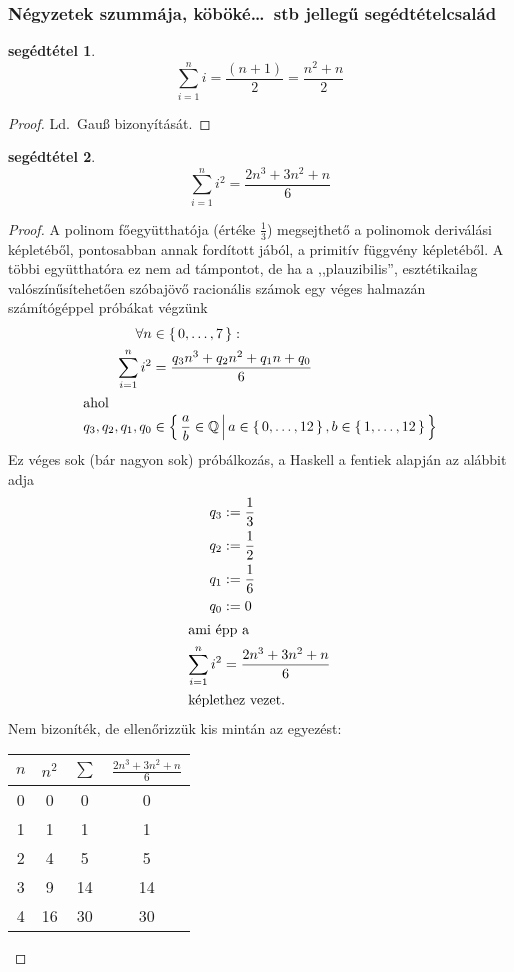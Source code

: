 \documentclass{article}
\newtheorem{lemm}{segédtétel}
\newcommand{\parenthesed}[1]{\left(#1\right)}
\newcommand{\enumOf}[2]{\left\lbrace\,#1,\dots,#2\,\right\rbrace}
\newcommand{\setAbs}[2]{\left\lbrace\,#1\,\middle|\,#2\,\right\rbrace}
\begin{document}
	\subsubsection{Négyzetek szummája, köböké\dots\ stb jellegű segédtételcsalád}

	\begin{lemm}
		\[
			\sum_{i=1}^n i = \frac{\parenthesed{n+1}}2 = \frac{n^2+n}2
		\]
	\end{lemm}
	\begin{proof}
		Ld.~Gauß bizonyítását.
	\end{proof}

	\begin{lemm}
		\[
			\sum_{i=1}^n i^2 = \frac{2n^3+3n^2+n}6
		\]
	\end{lemm}
	\begin{proof}
		A polinom főegyütthatója (értéke $\frac13$) megsejthető a polinomok deriválási képletéből, pontosabban annak fordított jából, a primitív függvény képletéből.
		A többi együtthatóra ez nem ad támpontot, de ha a ,,plauzibilis'', esztétikailag valószínűsítehetően szóbajövő racionális számok egy véges halmazán számítógéppel próbákat végzünk
		\begin{align}
			\forall n &\in \enumOf07:\\
			\sum_{i=1}^n i^2 &= \frac{q_3n^3+q_2n^2+q_1n+q_0}6\\\intertext{ahol}
			q_3, q_2, q_1, q_0 &\in \setAbs{\frac ab\in\mathbb Q}{a \in \enumOf0{12}, b \in \enumOf1{12}}
		\end{align}
		Ez véges sok (bár nagyon sok) próbálkozás,
		a Haskell a fentiek alapján az alábbit adja
		\begin{align*}
			q_3 &:= \frac13\\
			q_2 &:= \frac12\\
			q_1 &:= \frac16\\
			q_0 &:= 0\\\intertext{ami épp a}
			\sum_{i=1}^n i^2 &= \frac{2n^3+3n^2+n}6\\\intertext{képlethez vezet.}
		\end{align*}
		Nem bizoníték, de ellenőrizzük kis mintán az egyezést:
		\begin{table}[H]
			\begin{tabular}{c|c|c||c}
				$n$	&	$n^2$	&	$\sum$	&	$\frac{2n^3+3n^2+n}6$\\\hline\hline
				0	&	0	&	0	&	0\\\hline
				1	&	1	&	1	&	1\\\hline
				2	&	4	&	5	&	5\\\hline
				3	&	9	&	14	&	14\\\hline
				4	&	16	&	30	&	30
			\end{tabular}
		\end{table}
	\end{proof}
\end{document}
